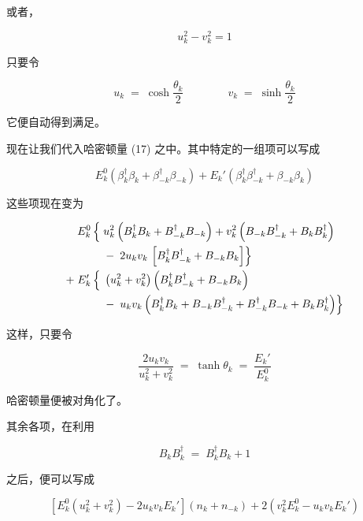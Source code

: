 或者，

\begin{equation*}
u_k^{2} - v_k^{2} = 1
\end{equation*}

只要令

\begin{equation*}
u_k \;=\; \cosh\frac{\theta_k}{2} \qquad\qquad v_k \;=\; \sinh\frac{\theta_k}{2}
\end{equation*}

它便自动得到满足。

现在让我们代入哈密顿量 (17) 之中。其中特定的一组项可以写成

\begin{equation*}
E_k^{0}\left(\beta_k^{\dagger}\beta_k + \beta_{-k}^{\dagger}\beta_{-k}\right) + E_k'\left(\beta_k^{\dagger}\beta_{-k}^{\dagger} + \beta_{-k}\beta_k\right)
\end{equation*}

这些项现在变为

\begin{align*}
E_k^{0}\,\Bigl\{\; & u_k^{2}\left(B_k^{\dagger}B_k + B_{-k}^{\dagger}B_{-k}\right) + v_k^{2}\left(B_{-k}B_{-k}^{\dagger} + B_k B_k^{\dagger}\right) \\
& -\; 2u_k v_k\,\left[B_k^{\dagger}B_{-k}^{\dagger} + B_{-k}B_k\right]\Bigr\} \\
+\; E_k'\,\Bigl\{\; & \left(u_k^{2} + v_k^{2}\right)\left(B_k^{\dagger}B_{-k}^{\dagger} + B_{-k}B_k\right) \\
& -\; u_k v_k\left(B_k^{\dagger}B_k + B_{-k}B_{-k}^{\dagger} + B_{-k}^{\dagger}B_{-k} + B_k B_k^{\dagger}\right)\Bigr\}
\end{align*}

这样，只要令

\begin{equation*}
\frac{2u_k v_k}{u_k^{2} + v_k^{2}} \;=\; \tanh\theta_k \;=\; \frac{E_k'}{E_k^{0}} \tag{18}
\end{equation*}

哈密顿量便被对角化了。

其余各项，在利用

\begin{equation*}
B_k B_k^{\dagger} \;=\; B_k^{\dagger} B_k + 1
\end{equation*}

之后，便可以写成

\begin{equation*}
\left[E_k^{0}\left(u_k^{2} + v_k^{2}\right) - 2u_k v_k E_k'\right]\left(n_k + n_{-k}\right) + 2\left(v_k^{2}E_k^{0} - u_k v_k E_k'\right)
\end{equation*}

